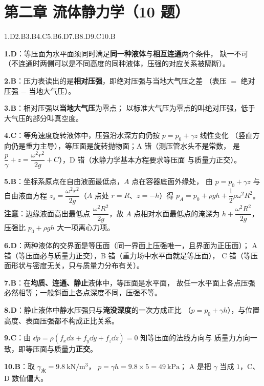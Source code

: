 \section*{第二章 流体静力学（10 题）}

\noindent 1.D\quad 2.B\quad 3.B\quad 4.C\quad 5.B\quad 6.D\quad 7.B\quad 8.D\quad 9.C\quad 10.B

\begin{tishi}
\begin{xiaowen}
\item \textbf{1.D}：等压面为水平面须同时满足\textbf{同一种液体}与\textbf{相互连通}两个条件，
缺一不可（不连通时两侧可以是不同高度的同种液体，压强的对应关系被隔断）。
\item \textbf{2.B}：压力表读出的是\textbf{相对压强}，即绝对压强与当地大气压之差
（表压 $=$ 绝对压强 $-$ 当地大气压）。
\item \textbf{3.B}：相对压强以\textbf{当地大气压}为零点；
以标准大气压为零点的叫绝对压强，低于大气压的部分叫真空度。
\item \textbf{4.C}：等角速度旋转液体中，压强沿水深方向仍按 $p=p_0+\gamma z$ 线性变化
（竖直方向仍是重力主导），等压面是旋转抛物面；A 错（测压管水头不是常数，
是 $\dfrac{p}{\gamma}+z=\dfrac{\omega^2r^2}{2g}+C$），D 错（水静力学基本方程要求等压面
与质量力正交）。
\item \textbf{5.B}：坐标系原点在自由液面最低点，$A$ 点在容器底面外缘处，
由 $p=p_0+\gamma z$ 与自由液面方程 $z_s=\dfrac{\omega^2r^2}{2g}$（$A$ 点处 $r=R$、$z=-h$）得
$p_A=p_0+\rho gh+\dfrac{1}{2}\rho\omega^2R^2$。\textbf{注意}：边缘液面高出最低点
$\dfrac{\omega^2R^2}{2g}$，故 $A$ 点相对水面最低点的淹深为
$h+\dfrac{\omega^2R^2}{2g}$，压强比 $p_0+\rho gh$ 大一项离心力项。
\item \textbf{6.D}：两种液体的交界面是等压面（同一界面上压强唯一，且界面为正压面）；
A 错（等压面必与质量力正交），B 错（重力场中水平面就是等压面），
C 错（等压面形状与密度无关，只与质量力分布有关）。
\item \textbf{7.B}：在\textbf{均质、连通、静止}液体中，等压面是水平面，
故任一水平面上各点压强必然相等；一般斜面上各点深度不同，压强不等。
\item \textbf{8.D}：静止液体中静水压强只与\textbf{淹没深度}的一次方成正比
（$p=p_0+\gamma h$），与位置高度、表面压强都不构成正比关系。
\item \textbf{9.C}：由 $\dd p=\rho(f_x\dd x+f_y\dd y+f_z\dd z)=0$ 知等压面的法线方向与
质量力方向一致，即等压面与质量力\textbf{正交}。
\item \textbf{10.B}：取 $\gamma_{\text{水}}=9.8\ \mathrm{kN/m^3}$，
$p=\gamma h=9.8\times5=49\ \mathrm{kPa}$；
A 是把 $\gamma$ 当成 $1$，C、D 数值偏大。
\end{xiaowen}
\end{tishi}

